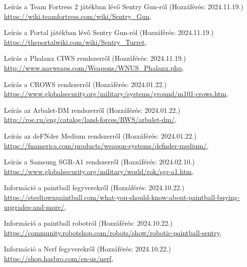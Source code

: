 \documentclass[12pt,a4paper]{article}
\begin{document}
\pagebreak
	\begin{thebibliography}{}
	
	Leírás a Team Fortress 2 játékban lévő Sentry Gun-ról \hfill (Hozzáférés: 2024.11.19.) \\
	{\footnotesize \url{https://wiki.teamfortress.com/wiki/Sentry_Gun}},
	
	Leírás a Portal játékban lévő Sentry Gun-ról \hfill (Hozzáférés: 2024.11.19.) \\
	{\footnotesize \url{https://theportalwiki.com/wiki/Sentry_Turret}},
	
	Leírás a Phalanx CIWS rendszerről \hfill (Hozzáférés: 2024.11.19.) \\
	{\footnotesize \url{http://www.navweaps.com/Weapons/WNUS_Phalanx.php}},
	
	Leírás a CROWS rendszerről \hfill (Hozzáférés: 2024.01.22.) \\
	{\footnotesize \url{https://www.globalsecurity.org/military/systems/ground/m101-crows.htm}},
	
	Leírás az Arbalet-DM rendszerről \hfill (Hozzáférés: 2024.01.22.) \\
	{\footnotesize \url{http://roe.ru/eng/catalog/land-forces/RWS/arbalet-dm/}},
	
	Leírás az deFNder Medium rendszerről \hfill (Hozzáférés: 2024.01.22.) \\
	{\footnotesize \url{https://fnamerica.com/products/weapon-systems/defnder-medium/}},
	
	Leírás a Samsung SGR-A1 rendszerről \hfill (Hozzáférés: 2024.02.10.) \\
	{\footnotesize \url{https://www.globalsecurity.org/military/world/rok/sgr-a1.htm}},
	
	Információ a paintball fegyverekről \hfill (Hozzáférés: 2024.10.22.) \\
	{\footnotesize \url{https://steeltownpaintball.com/what-you-should-know-about-paintball-buying-upgrades-and-more/}},
	
	Információ a paintball robotról \hfill (Hozzáférés: 2024.10.22.) \\
	{\footnotesize \url{https://community.robotshop.com/robots/show/robotic-paintball-sentry}},

	Információ a Nerf fegyverekről \hfill (Hozzáférés: 2024.10.22.) \\
	{\footnotesize \url{https://shop.hasbro.com/en-us/nerf}},
	

\end{thebibliography}
\end{document}
